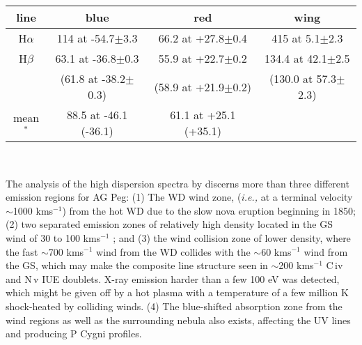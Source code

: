 \documentclass[a4paper,fleqn,usenatbib,useAMS]{mnras}
\def\ie{{\it i.e.,} }
\def\ha{H{$\alpha$}}
\def\hb{H{$\beta$}}
\def\civ{C\,{\sc iv}}
\def\nv{N\,{\sc v}}
\def\kms{km\hspace{1pt}s$^{-1}$}
\begin{document}
{%

\begin{table*}
\caption{FWHM and peak center of the line profiles.
FWHM: {\kms}.  The 30 min measurements are given in parentheses. The FWHMs of the {\ha} and {\hb} lines and their centers  are from the Gaussian profiles. $^*$: kinematic profile centers in parentheses (assuming the radial correction velocity with  $V_{\rm r}$ = $-19.09\pm$0.14).
Note that the center of the {\hb} broad wing differs from that of the {\ha}. See Fig.~\ref{fig2}.}
\vspace{-0.5cm}
\begin{tabular}{cccc}\\
\hline \hline

line & blue & red & wing  \\

\hline
{\ha}  &  114 at -54.7$\pm$3.3  &  66.2 at +27.8$\pm$0.4  &  415 at 5.1$\pm$2.3  \\
{\hb}  &  63.1 at -36.8$\pm$0.3  &  55.9 at +22.7$\pm$0.2  &  134.4 at 42.1$\pm$2.5  \\
       &  (61.8 at -38.2$\pm$0.3)  &  (58.9 at +21.9$\pm$0.2)  &  (130.0 at 57.3$\pm$2.3)  \\
mean$^*$  &   88.5 at -46.1 (-36.1)  &  61.1 at +25.1 (+35.1)  &   \\
\hline

\end{tabular} \\
\label{tb3}
\end{table*}

The analysis of the high dispersion spectra by \citet{nus95, ken93, eri04} discerns more than three different emission regions for AG Peg: (1) The WD wind zone, (\ie at a terminal velocity $\sim$1000 {\kms}) from the hot WD due to the slow nova eruption beginning in 1850; (2) two separated emission zones of relatively high density located in the GS wind of 30 to 100 {\kms} \citep{eri04}; and (3) the wind collision zone of lower density,  where the fast $\sim$700 {\kms} wind from the WD collides with the $\sim$60 {\kms} wind from the GS, which may make the composite line structure seen in $\sim$200 {\kms} {\civ} and {\nv} IUE doublets. X-ray emission harder than a few 100 eV was detected, which might be given off by a hot plasma with a temperature of a few million K shock-heated by colliding winds.
(4) The blue-shifted absorption zone from the wind regions as well as the surrounding nebula also  exists, affecting the UV lines and producing P Cygni profiles.

}
\end{document}
